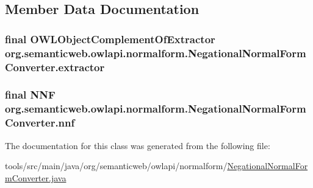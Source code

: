 \subsection{Member Data Documentation}
\hypertarget{classorg_1_1semanticweb_1_1owlapi_1_1normalform_1_1_negational_normal_form_converter_aec1e132e0f6defdd4ade24c11d5f9438}{
\subsubsection[{extractor}]{\setlength{\rightskip}{0pt plus 5cm}final {\bf O\-W\-L\-Object\-Complement\-Of\-Extractor} org.\-semanticweb.\-owlapi.\-normalform.\-Negational\-Normal\-Form\-Converter.\-extractor\hspace{0.3cm}{\ttfamily [private]}}}\label{classorg_1_1semanticweb_1_1owlapi_1_1normalform_1_1_negational_normal_form_converter_aec1e132e0f6defdd4ade24c11d5f9438}
\hypertarget{classorg_1_1semanticweb_1_1owlapi_1_1normalform_1_1_negational_normal_form_converter_a0df53e6f4c0a93f0104ec8995922555b}{
\subsubsection[{nnf}]{\setlength{\rightskip}{0pt plus 5cm}final {\bf N\-N\-F} org.\-semanticweb.\-owlapi.\-normalform.\-Negational\-Normal\-Form\-Converter.\-nnf\hspace{0.3cm}{\ttfamily [private]}}}\label{classorg_1_1semanticweb_1_1owlapi_1_1normalform_1_1_negational_normal_form_converter_a0df53e6f4c0a93f0104ec8995922555b}


The documentation for this class was generated from the following file\-:\begin{DoxyCompactItemize}
\item 
tools/src/main/java/org/semanticweb/owlapi/normalform/\hyperlink{_negational_normal_form_converter_8java}{Negational\-Normal\-Form\-Converter.\-java}\end{DoxyCompactItemize}
